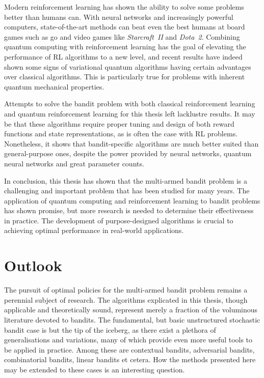 
Modern reinforcement learning has shown the ability to solve some problems better than humans can.
With neural networks and increasingly powerful computers, state-of-the-art methods can beat even the best humans at board games such as go and video games like \textit{Starcraft~II} and \textit{Dota~2}.
Combining quantum computing with reinforcement learning has the goal of elevating the performance of RL algorithms to a new level, and recent results have indeed shown some signs of variational quantum algorithms having certain advantages over classical algorithms.
This is particularly true for problems with inherent quantum mechanical properties.

Attempts to solve the bandit problem with both classical reinforcement learning and quantum reinforcement learning for this thesis left lacklustre results.
It may be that these algorithms require proper tuning and design of both reward functions and state representations, as is often the case with RL problems.
Nonetheless, it shows that bandit-specific algorithms are much better suited than general-purpose ones, despite the power provided by neural networks, quantum neural networks and great parameter counts.

In conclusion, this thesis has shown that the multi-armed bandit problem is a challenging and important problem that has been studied for many years.
The application of quantum computing and reinforcement learning to bandit problems has shown promise, but more research is needed to determine their effectiveness in practice.
The development of purpose-designed algorithms is crucial to achieving optimal performance in real-world applications.

\section{Outlook}
The pursuit of optimal policies for the multi-armed bandit problem remains a perennial subject of research.
The algorithms explicated in this thesis, though applicable and theoretically sound, represent merely a fraction of the voluminous literature devoted to bandits.
The fundamental, but basic unstructured stochastic bandit case is but the tip of the iceberg, as there exist a plethora of generalisations and variations, many of which provide even more useful tools to be applied in practice.
Among these are contextual bandits, adversarial bandits, combinatorial bandits, linear bandits et cetera.
How the methods presented here may be extended to these cases is an interesting question.

